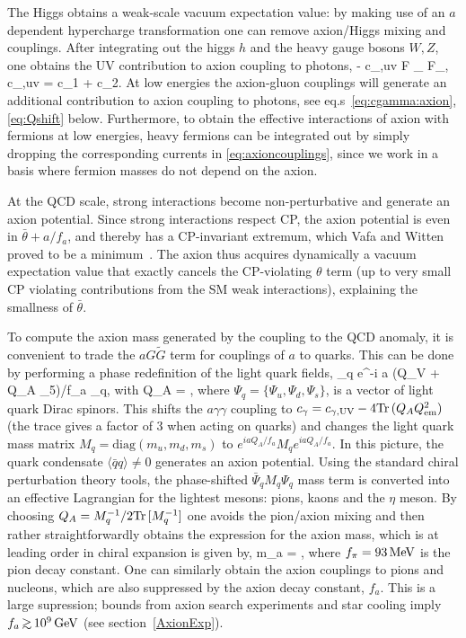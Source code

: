 The Higgs obtains a weak-scale vacuum expectation value:
by making use of an $a$ dependent hypercharge transformation one can
remove axion/Higgs mixing and couplings.  
After integrating out the higgs $h$ and the heavy gauge bosons $W,Z$,
one obtains the UV contribution to axion coupling to photons,
\beq  - \frac{\alpha}{8\pi}c_{\gamma,{\rm uv}}  F _{\mu\nu} \tilde F_{\mu\nu},
\qquad
c_{\gamma,{\rm uv}} = c_1 + c_2.
\label{eq:gagammagamma1}
\eeq
At low energies the axion-gluon couplings will generate an additional contribution to axion coupling to photons, see eq.s~\eqref{eq:cgamma:axion}, \eqref{eq:Qshift} below. Furthermore, to obtain the effective interactions of axion with fermions at low energies, 
heavy fermions can be integrated out by simply dropping the corresponding currents in \eqref{eq:axioncouplings}, since we work in a basis where 
fermion masses do not depend on the axion. 

At the QCD scale, strong interactions become non-perturbative and generate an axion potential.
Since strong interactions respect CP, the axion potential is even in $\bar \theta + a/f_a$,
and thereby has a CP-invariant extremum, which
Vafa and Witten proved to be a minimum~\cite{Vafa:1984xg}.
The axion thus acquires dynamically a vacuum expectation
value that exactly cancels the CP-violating $\theta$ term (up to very small CP violating contributions from the SM weak interactions), explaining the smallness of $\bar \theta$.

To compute the axion mass generated by the coupling to the QCD anomaly, it is convenient to trade the $a G\tilde{G}$ term for couplings of $a$ to quarks. This can be done by 
performing a phase redefinition of  the light quark fields,
\beq  
\Psi_q \to e^{-i a (Q_V + Q_A \gamma_5)/f_a} \Psi_q,
\qquad\hbox{with}
\label{eq:Qshift}
\qquad \Tr Q_A = ,
\eeq
where $\Psi_q=\{\Psi_u,\Psi_d,\Psi_s\}$, is a vector of light quark Dirac spinors.
This  shifts the $a\gamma\gamma$ coupling to $c_\gamma= c_{\gamma,{\rm UV}} - 4 \hbox{Tr}\, (Q_A Q^2_{\rm em})$
(the trace gives a factor of 3 when acting on quarks)
and changes the light quark mass matrix $M_q=\text{diag}(m_u, m_d, m_s)$  
to $e^{iaQ_A/f_a} M_q e^{i aQ_A/f_a}$.
In this picture, the quark condensate $\langle \bar q q\rangle\ne0$ generates an axion potential.
Using the standard chiral perturbation theory tools,  the phase-shifted $\bar \Psi_q M_q \Psi_q$ mass term is  converted into an 
effective Lagrangian for the lightest mesons: pions, kaons and the $\eta$ meson.
By choosing $Q_A = M^{-1}_q/2\hbox{Tr}\,[M_q^{-1}]$ one avoids the pion/axion mixing and then rather straightforwardly obtains the expression for the axion mass, which is at leading order in chiral expansion is given by, 
\beq 
m_a =   \meV  {},
\label{eq:maxion}
\eeq
where $f_\pi = 93\,{\rm MeV}$ is the 
pion decay constant.
One can similarly obtain the axion couplings to pions and nucleons, which are also suppressed by the axion decay constant, $f_a$. This is a large supression;  bounds from axion search experiments and star cooling imply $f_a \circa{>} 10^9\GeV$ (see section~\ref{AxionExp}).



